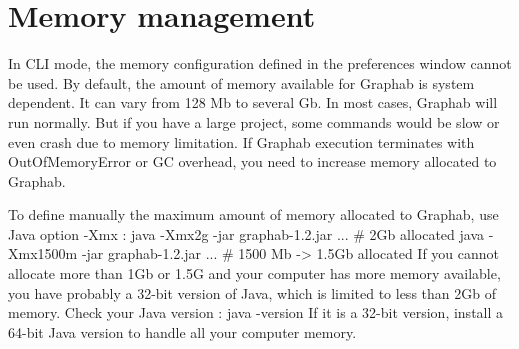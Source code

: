 \documentclass[a4paper,10pt]{report}
\newenvironment{cmd}
{\quote\Verbatim}
{\endVerbatim\endquote}
\begin{document}
\section{Memory management}
In CLI mode, the memory configuration defined in the preferences window cannot be used.
By default, the amount of memory available for Graphab is system dependent. It can vary from 128 Mb to several Gb.
In most cases, Graphab will run normally. But if you have a large project, some commands would be slow or even crash due to memory limitation.
If Graphab execution terminates with OutOfMemoryError or GC overhead, you need to increase memory allocated to Graphab.

To define manually the maximum amount of memory allocated to Graphab, use Java option -Xmx :
\begin{cmd}
java -Xmx2g -jar graphab-1.2.jar ... # 2Gb allocated
java -Xmx1500m -jar graphab-1.2.jar ... # 1500 Mb -> 1.5Gb allocated
\end{cmd}
If you cannot allocate more than 1Gb or 1.5G and your computer has more memory available, you have probably a
 32-bit version of Java, which is limited to less than 2Gb of memory.
Check your Java version :
\begin{cmd}
java -version
\end{cmd}
If it is a 32-bit version, install a 64-bit Java version to handle all your computer memory.
\end{document}
